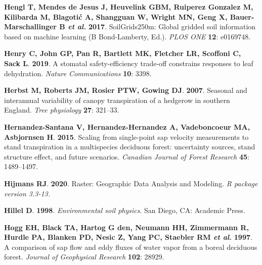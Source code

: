 \documentclass[11pt,twoside]{reedthesis}
\begin{document}
\hypertarget{ref-hengl_soilgrids250m_2017}{}
\textbf{\textnormal{Hengl T}, \textnormal{Mendes de Jesus J},
\textnormal{Heuvelink GBM}, \textnormal{Ruiperez Gonzalez M},
\textnormal{Kilibarda M}, \textnormal{Blagotić A}, \textnormal{Shangguan
W}, \textnormal{Wright MN}, \textnormal{Geng X},
\textnormal{Bauer-Marschallinger B} \emph{et al.}} \textbf{2017}.
SoilGrids250m: Global gridded soil information based on machine learning
(B Bond-Lamberty, Ed.). \emph{PLOS ONE} \textbf{12}: e0169748.

\hypertarget{ref-henry_stomatal_2019}{}
\textbf{\textnormal{Henry C}, \textnormal{John GP}, \textnormal{Pan R},
\textnormal{Bartlett MK}, \textnormal{Fletcher LR}, \textnormal{Scoffoni
C}, \textnormal{Sack L}}. \textbf{2019}. A stomatal safety-efficiency
trade-off constrains responses to leaf dehydration. \emph{Nature
Communications} \textbf{10}: 3398.

\hypertarget{ref-Herbst2007}{}
\textbf{\textnormal{Herbst M}, \textnormal{Roberts JM},
\textnormal{Rosier PTW}, \textnormal{Gowing DJ}}. \textbf{2007}.
Seasonal and interannual variability of canopy transpiration of a
hedgerow in southern England. \emph{Tree physiology} \textbf{27}:
321--33.

\hypertarget{ref-Hernandez-Santana2015}{}
\textbf{\textnormal{Hernandez-Santana V},
\textnormal{Hernandez-Hernandez A}, \textnormal{Vadeboncoeur MA},
\textnormal{Asbjornsen H}}. \textbf{2015}. Scaling from single-point sap
velocity measurements to stand transpiration in a multispecies deciduous
forest: uncertainty sources, stand structure effect, and future
scenarios. \emph{Canadian Journal of Forest Research} \textbf{45}:
1489--1497.

\hypertarget{ref-hijmans_raster_2020}{}
\textbf{\textnormal{Hijmans RJ}}. \textbf{2020}. Raster: Geographic Data
Analysis and Modeling. \emph{R package version 3.3-13.}

\hypertarget{ref-hillel_environmental_1998}{}
\textbf{\textnormal{Hillel D}}. \textbf{1998}. \emph{Environmental soil
physics}. San Diego, CA: Academic Press.

\hypertarget{ref-Hogg1997}{}
\textbf{\textnormal{Hogg EH}, \textnormal{Black TA}, \textnormal{Hartog
G den}, \textnormal{Neumann HH}, \textnormal{Zimmermann R},
\textnormal{Hurdle PA}, \textnormal{Blanken PD}, \textnormal{Nesic Z},
\textnormal{Yang PC}, \textnormal{Staebler RM} \emph{et al.}}
\textbf{1997}. A comparison of sap flow and eddy fluxes of water vapor
from a boreal deciduous forest. \emph{Journal of Geophysical Research}
\textbf{102}: 28929.
\end{document}
